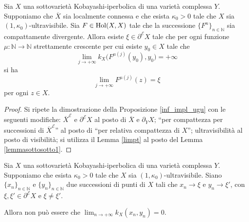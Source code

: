 \begin{prop} \label{unaproppp}
    Sia $X$ una sottovarietà Kobayashi-iperbolica di una varietà complessa $Y$. Supponiamo che $\overline{X}$ sia localmente connessa e che esista $\kappa_0>0$ tale che $X$ sia $(1,\kappa_0)$-ultravisibile. Sia $F\in\textnormal{Hol}(X,X)$ tale che la successione $\{F^n\}_{n\in\mathbb{N}}$ sia compattamente divergente. Allora esiste $\xi\in\partial^\mathcal{E}X$ tale che per ogni funzione $\mu:\mathbb{N}\longrightarrow\mathbb{N}$ strettamente crescente per cui esiste $y_0 \in X$ tale che
    \begin{equation}
        \lim_{j\longrightarrow+\infty} k_X\big(F^{\mu(j)}(y_0),y_0\big)=+\infty
    \end{equation}
    si ha
    \begin{equation}
        \lim_{j\longrightarrow+\infty} F^{\mu(j)}(z)=\xi
    \end{equation}
    per ogni $z \in X$.
\end{prop}

\begin{proof}
    Si ripete la dimostrazione della Proposizione \ref{inf_impl_ugu} con le seguenti modifiche: $\overline{X}^\mathcal{E}$ e $\partial^\mathcal{E}X$ al posto di $\overline{X}$ e $\partial_YX$; ``per compattezza per successioni di $\overline{X}^\mathcal{E}$'' al posto di ``per relativa compattezza di $X$''; ultravisibilità al posto di visibilità; si utilizza il Lemma \ref{limpt} al posto del Lemma \ref{lemmasottosotto1}.
\end{proof}

\begin{lm} \label{nonazeroplease}
    Sia $X$ una sottovarietà Kobayashi-iperbolica di una varietà complessa $Y$. Supponiamo che esista $\kappa_0>0$ tale che $X$ sia $(1,\kappa_0)$-ultravisibile. Siano $\{x_n\}_{n\in\mathbb{N}}$ e $\{y_n\}_{n\in\mathbb{N}}$ due successioni di punti di $X$ tali che $x_n\longrightarrow\xi$ e $y_n\longrightarrow\xi'$, con $\xi,\xi'\in\partial^\mathcal{E}X$ e $\xi\not=\xi'$.
    
    Allora non può essere che $\displaystyle\lim_{n\longrightarrow+\infty}k_X(x_n,y_n)=0$.
\end{lm}

